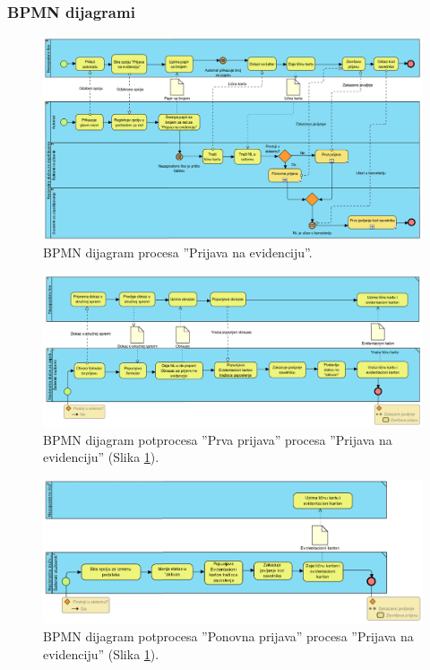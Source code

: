 \begin{mylandscape}
	\subsubsection{BPMN dijagrami}
	
	\begin{figure}[H]
		\centering
		\includegraphics[width=0.7\paperwidth]{dijagrami/bpmn-dijagrami/prijava-na-evidenciju.png}
		\caption{BPMN dijagram procesa ''Prijava na evidenciju''.}
		\label{bpmnd: prijava na evidenciju}
	\end{figure}
	
	\newpage
	
	\begin{figure}[H]
		\centering
		\includegraphics[width=0.8\paperwidth]{dijagrami/bpmn-dijagrami/prva-prijava.png}
		\caption{BPMN dijagram potprocesa ''Prva prijava'' procesa ''Prijava na evidenciju'' (Slika \ref{bpmnd: prijava na evidenciju}).}
	\end{figure}
	
	\newpage
	
	\begin{figure}[H]
		\centering
		\includegraphics[width=0.8\paperwidth]{dijagrami/bpmn-dijagrami/ponovna-prijava.png}
		\caption{BPMN dijagram potprocesa ''Ponovna prijava'' procesa ''Prijava na evidenciju''  (Slika \ref{bpmnd: prijava na evidenciju}).}
	\end{figure}
	

\end{mylandscape}

